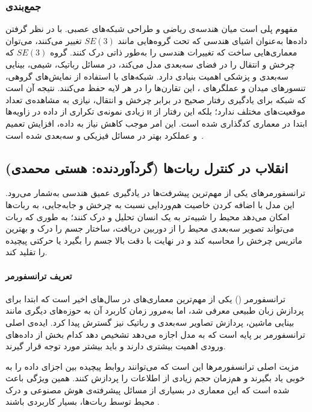 \documentclass{article}
\begin{document}
\subsubsection{جمع‌بندی}

مفهوم  پلی است میان هندسه‌ی ریاضی و طراحی شبکه‌های عصبی. با در نظر گرفتن داده‌ها به‌عنوان اشیای هندسی که تحت گروه‌هایی مانند \(SE(3)\) تغییر می‌کنند، می‌توان معماری‌هایی ساخت که تغییرات هندسی را به‌طور ذاتی درک کنند. گروه \(SE(3)\) که چرخش و انتقال را در فضای سه‌بعدی مدل می‌کند، در مسائل رباتیک، شیمی، بینایی سه‌بعدی و پزشکی اهمیت بنیادی دارد. شبکه‌های  با استفاده از نمایش‌های گروهی، تنسورهای میدان و عملگرهای ، این تقارن‌ها را در هر لایه حفظ می‌کنند. نتیجه آن است که شبکه برای یادگیری رفتار صحیح در برابر چرخش و انتقال، نیازی به مشاهده‌ی تعداد زیادی نمونه‌ی تکراری از داده در زاویه‌ها и موقعیت‌های مختلف ندارد؛ بلکه این رفتار از ابتدا در معماری کدگذاری شده است. این امر موجب کاهش نیاز به داده، افزایش تعمیم و عملکرد بهتر در مسائل فیزیکی و سه‌بعدی شده است~\cite{cohen2016group,thomas2018tensor,fuchs2020se,satorras2021en,bronstein2021geometric}.


\subsection{انقلاب در کنترل ربات‌ها  (گردآوردنده: هستی محمدی)}
ترانسفورمرهای  یکی از مهم‌ترین پیشرفت‌ها در یادگیری عمیق هندسی به‌شمار می‌رود. این مدل با اضافه کردن خاصیت هم‌وردایی نسبت به چرخش و جابه‌جایی، به ربات‌ها امکان می‌دهد محیط را شبیه‌تر به یک انسان تحلیل و درک کنند؛ به طوری که ربات می‌تواند تصویر سه‌بعدی محیط را از دوربین دریافت، ساختار جسم را درک و بهترین ماتریس چرخش را محاسبه کند و در نهایت با دقت بالا جسم را بگیرد یا حرکتی پیچیده را تقلید کند.
\paragraph{تعریف ترانسفورمر}
ترانسفورمر () یکی از مهم‌ترین معماری‌های  در سال‌های اخیر است که ابتدا برای پردازش زبان طبیعی  معرفی شد، اما به‌مرور زمان کاربرد آن به حوزه‌های دیگری مانند بینایی ماشین، پردازش تصاویر سه‌بعدی و رباتیک نیز گسترش پیدا کرد. ایده‌ی اصلی ترانسفورمر بر پایه‌   است که به مدل اجازه می‌دهد تشخیص دهد کدام بخش از داده‌های ورودی اهمیت بیشتری دارند و باید بیشتر مورد توجه قرار گیرند.

مزیت اصلی ترانسفورمرها این است که می‌توانند روابط پیچیده بین اجزای داده را به خوبی یاد بگیرند و هم‌زمان حجم زیادی از اطلاعات را پردازش کنند. همین ویژگی باعث شده است که این معماری در بسیاری از مسائل پیشرفته‌ی هوش مصنوعی و درک محیط توسط ربات‌ها، بسیار کاربردی باشند \cite{vaswani2017}. 
\end{document}
